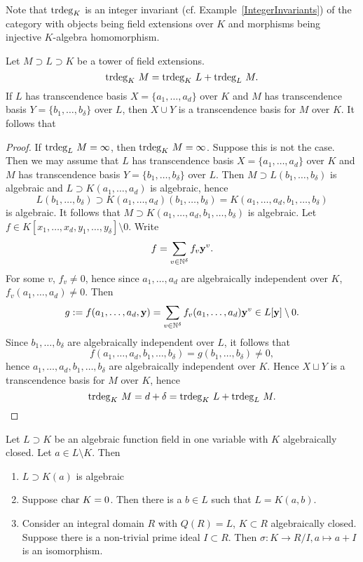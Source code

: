 \begin{remark}
    Note that $\mathrm{trdeg }_K$ is an integer invariant (cf. Example~\ref{IntegerInvariants}) of the category with objects being field extensions over $K$ and morphisms being injective $K$-algebra homomorphism.
\end{remark}
\begin{lemma}
    Let $M\supset L\supset K$ be a tower of field extensions.
    $$\trdeg_K \ M = \trdeg_K\ L+ \trdeg_L \ M.$$
    If $L$ has transcendence basis $X=\{a_1,\dots,a_d\}$ over $K$ and $M$ has transcendence basis $Y=\{b_1,\dots,b_\delta\}$ over $L$, then $X\cup Y$ is a transcendence basis for $M$ over $K$. It follows that 
\end{lemma}
\begin{proof}
    If $\mathrm{trdeg }_L \ M = \infty$, then $\mathrm{trdeg }_K \ M = \infty$. Suppose this is not the case. Then we may assume that $L$ has transcendence basis $X=\{a_1,\dots,a_d\}$ over $K$ and $M$ has transcendence basis $Y=\{b_1,\dots,b_\delta\}$ over $L$. Then $M\supset L(b_1,\dots,b_\delta)$ is algebraic and $L\supset K(a_1,\dots,a_d)$ is algebraic, hence $$L(b_1,\dots,b_\delta)\supset K(a_1,\dots,a_d)(b_1,\dots,b_\delta)=K(a_1,\dots,a_d,b_1,\dots,b_\delta)$$
    is algebraic. It follows that $M\supset K(a_1,\dots,a_d,b_1,\dots,b_\delta)$ is algebraic. Let $f\in K[x_1,\dots,x_d,y_1,\dots,y_\delta]\setminus 0$. Write 
    $$f = \sum_{v\in\mathbb{N}^\delta} f_v \mathbf{y}^v.$$
    For some $v$, $f_v\neq 0$, hence since $a_1,\dots,a_d$ are algebraically independent over $K$, $f_v(a_1,\dots,a_d)\neq 0$. Then 
    $$g := f(a_1,\dots,a_d,\mathbf{y}) = \sum_{v\in\mathbb{N}^\delta} f_v(a_1,\dots,a_d)\mathbf{y}^v\in L[\mathbf{y}]\setminus 0.$$
    Since $b_1,\dots,b_\delta$ are algebraically independent over $L$, it follows that 
    $$f(a_1,\dots,a_d,b_1,\dots,b_\delta) = g(b_1,\dots,b_\delta)\neq 0,$$
    hence $a_1,\dots,a_d,b_1,\dots,b_\delta$ are algebraically independent over $K$. Hence $X\sqcup Y$ is a transcendence basis for $M$ over $K$, hence 
    $$\mathrm{trdeg }_K\ M = d+\delta = \mathrm{trdeg }_K\ L + \mathrm{trdeg }_L \ M.$$
\end{proof}
\begin{lemma}\label{AlgebraicFuntionFieldsInOneVariable}
    Let $L\supset K$ be an algebraic function field in one variable with $K$ algebraically closed. Let $a\in L\setminus K$. Then 
    \begin{enumerate}
        \item $L\supset K(a)$ is algebraic
        \item Suppose $\mathrm{char}\ K =0$. Then there is a $b\in L$ such that $L=K(a,b)$.
        \item Consider an integral domain $R$ with $Q(R)=L$, $K\subset R$ algebraically closed. Suppose there is a non-trivial prime ideal $I\subset R$. Then $\sigma: K\rightarrow R/I, a\mapsto a+ I$ is an isomorphism.
    \end{enumerate}
\end{lemma}
